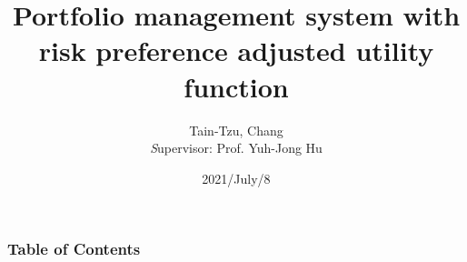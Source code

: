 \documentclass{beamer}
\title{Portfolio management system with risk preference adjusted utility function}
\author{
{Tain-Tzu, Chang}
\\
{\textit Supervisor:} 
{Prof. Yuh-Jong Hu}
}
\institute{Department of Computer Science, NCCU}
\date{2021/July/8}
\begin{document}
\frame{\titlepage}

\begin{frame}
\frametitle{Table of Contents}
\tableofcontents
\end{frame}

% 
% 

% 
% 
\end{document}
